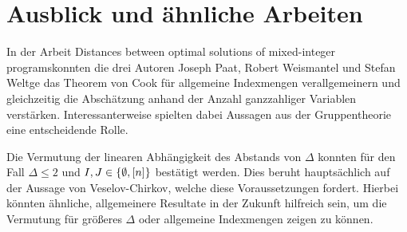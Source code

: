 \section{Ausblick und ähnliche Arbeiten}

In der Arbeit \glqq Distances between optimal solutions of mixed-integer programs\grqq konnten die drei Autoren Joseph Paat,
Robert Weismantel und Stefan Weltge das Theorem von Cook für allgemeine Indexmengen verallgemeinern und gleichzeitig die Abschätzung anhand der Anzahl ganzzahliger Variablen verstärken.
Interessanterweise spielten dabei Aussagen aus der Gruppentheorie eine entscheidende Rolle.

Die Vermutung der linearen Abhängigkeit des Abstands von $\Delta$ konnten für den Fall $\Delta\leq 2$ und $I,J\in\{\emptyset,[n]\}$ bestätigt werden.
Dies beruht hauptsächlich auf der Aussage von Veselov-Chirkov, welche diese Voraussetzungen fordert.
Hierbei könnten ähnliche, allgemeinere Resultate in der Zukunft hilfreich sein, um die Vermutung für größeres $\Delta$ oder allgemeine Indexmengen zeigen zu können.
